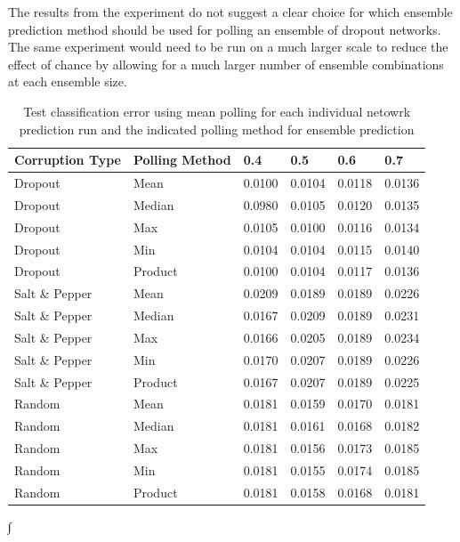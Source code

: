 \documentclass{article} %
\begin{document}
The results from the experiment do not suggest a clear choice for which ensemble prediction method should be used for polling an ensemble of dropout networks. The same experiment would need to be run on a much larger scale to reduce the effect of chance by allowing for a much larger number of ensemble combinations at each ensemble size.

\begin{table}[ht]
\caption{Test classification error using mean polling for each individual netowrk prediction run and the indicated polling method for ensemble prediction}
\label{tab:PollingMethods}
\begin{center}
\begin{tabular}{| l |  l  ||| l | l | l | l |}
\hline
Corruption Type & Polling Method & 0.4 & 0.5 & 0.6 & 0.7\\
\hline
\hline
Dropout & Mean & 0.0100 & 0.0104 & 0.0118 & 0.0136 \\
\hline
Dropout & Median & 0.0980 & 0.0105 & 0.0120 & 0.0135 \\
\hline
Dropout & Max & 0.0105 & 0.0100 & 0.0116 & 0.0134 \\
\hline
Dropout & Min & 0.0104 & 0.0104 & 0.0115 & 0.0140 \\
\hline
Dropout & Product & 0.0100 & 0.0104 & 0.0117 & 0.0136 \\
\hline
\hline
Salt \& Pepper & Mean & 0.0209 & 0.0189 & 0.0189 & 0.0226 \\
\hline
Salt \& Pepper & Median & 0.0167 & 0.0209 & 0.0189 & 0.0231\\
\hline
Salt \& Pepper & Max & 0.0166 & 0.0205 & 0.0189 & 0.0234 \\
\hline
Salt \& Pepper & Min & 0.0170 & 0.0207 & 0.0189 & 0.0226 \\
\hline
Salt \& Pepper & Product & 0.0167 & 0.0207 & 0.0189 & 0.0225 \\
\hline
\hline
Random & Mean & 0.0181 & 0.0159 & 0.0170 & 0.0181 \\
\hline
Random & Median & 0.0181 & 0.0161 & 0.0168 & 0.0182 \\
\hline
Random & Max & 0.0181 & 0.0156 & 0.0173 & 0.0185 \\
\hline
Random & Min & 0.0181 & 0.0155 & 0.0174 & 0.0185 \\
\hline
Random & Product & 0.0181 & 0.0158 & 0.0168 & 0.0181 \\
\hline
\end{tabular}∫
\end{center}
\end{table}
\end{document}
